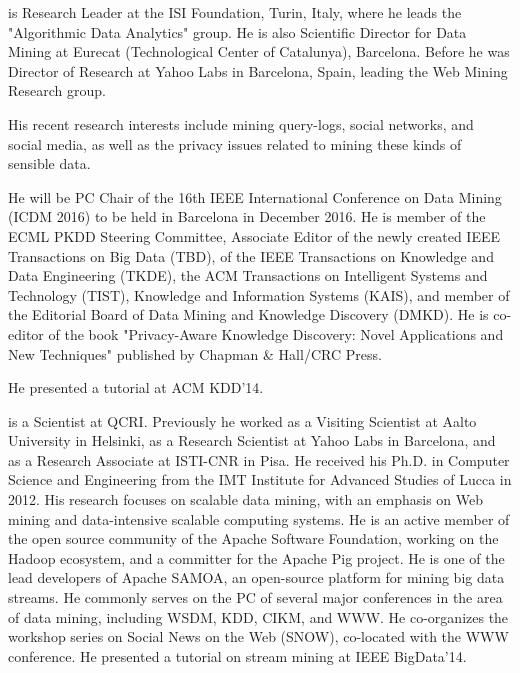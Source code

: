 \documentclass[pdfpagelabels=false]{sig-alternate-2013} %
\begin{document}
\smallskip
{} is Research Leader at the ISI Foundation, Turin, Italy,
where he leads the "Algorithmic Data Analytics" group. He is also Scientific
Director for Data Mining at Eurecat (Technological Center of Catalunya),
Barcelona. Before he was Director of Research at Yahoo Labs in Barcelona, Spain,
leading the Web Mining Research group.

His recent research interests include mining query-logs, social networks, and
social media, as well as the privacy issues related to mining these kinds of
sensible data.

He will be PC Chair of the 16th IEEE International Conference on Data Mining
(ICDM 2016) to be held in Barcelona in December 2016. He is member of the ECML
PKDD Steering Committee, Associate Editor of the newly created IEEE Transactions
on Big Data (TBD), of the IEEE Transactions on Knowledge and Data Engineering
(TKDE), the ACM Transactions on Intelligent Systems and Technology (TIST),
Knowledge and Information Systems (KAIS), and member of the Editorial Board of
Data Mining and Knowledge Discovery (DMKD).  %
He is co-editor of the book "Privacy-Aware Knowledge Discovery: Novel
Applications and New Techniques" published by Chapman \& Hall/CRC Press.

He presented a tutorial at ACM KDD'14.

\smallskip
{} is a Scientist at QCRI. Previously he worked as a Visiting Scientist at Aalto University in Helsinki, as a Research Scientist at Yahoo Labs in Barcelona, and as a Research Associate at ISTI-CNR in Pisa. He received his Ph.D. in Computer Science and Engineering from the IMT Institute for Advanced Studies of Lucca in 2012. His research focuses on scalable data mining, with an emphasis on Web mining and data-intensive scalable computing systems. He is an active member of the open source community of the Apache Software Foundation, working on the Hadoop ecosystem, and a committer for the Apache Pig project. He is one of the lead developers of Apache SAMOA, an open-source platform for mining big data streams. He commonly serves on the PC of several major conferences in the area of data mining, including WSDM, KDD, CIKM, and WWW. He co-organizes the workshop series on Social News on the Web (SNOW), co-located with the WWW conference. He presented a tutorial on stream mining at IEEE BigData'14.
\end{document}
